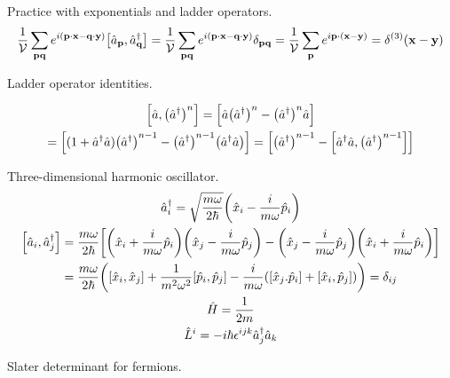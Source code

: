 \documentclass{report}
\begin{document}
\begin{subquests}
	\item Practice with exponentials and ladder operators.
	\begin{gather*}
		\frac{1}{\cal{V}}\sum_{\vb{pq}} e^{i\pqty{\vb p \cdot\vb x - \vb q \cdot \vb y}}\bqty{\hat{a}_{\vb p}, \hat{a}_{\vb q}^{\dagger}} = \frac{1}{\cal{V}}\sum_{\vb{pq}} e^{i\pqty{\vb p \cdot \vb x - \vb q \cdot \vb y}}\delta_{\vb{pq}} = \frac{1}{\cal{V}}\sum_{\vb p}e^{i \vb p \cdot\pqty{\vb x-\vb y}} = \delta^{(3)}(\vb x - \vb y)
	\end{gather*}

	\item Ladder operator identities.
	\begin{subquests}
		\item
		\begin{gather*}
			\bqty{\hat{a},\pqty{\hat{a}^{\dagger}}^n} = \bqty{\hat{a}\pqty{\hat{a}^{\dagger}}^n - \pqty{\hat{a}^{\dagger}}^n\hat{a}} \\
			= \bqty{(1+\hat{a}^{\dagger}\hat{a})\pqty{\hat{a}^{\dagger}}^{n-1} - \pqty{\hat{a}^{\dagger}}^{n-1}\pqty{\hat{a}^{\dagger}\hat{a}}} = \bqty{\pqty{\hat{a}^{\dagger}}^{n-1} - \bqty{\hat{a}^{\dagger}\hat{a},\pqty{\hat{a}^{\dagger}}^{n-1}}}		
		\end{gather*}

		\item

		\item

		\item
	\end{subquests}
	
	\item Three-dimensional harmonic oscillator.
	\begin{gather*}
		\hat{a}_i^{\dagger} = \sqrt{\frac{m\omega}{2\hbar}}\pqty{\hat{x}_i - \frac{i}{m\omega}\hat{p}_i} \\
		\bqty{\hat{a}_i,\hat{a}_j^{\dagger}} = \frac{m\omega}{2\hbar}\bqty{\pqty{\hat{x}_i + \frac{i}{m\omega}\hat{p}_i}\pqty{\hat{x}_j - \frac{i}{m\omega}\hat{p}_j} - \pqty{\hat{x}_j - \frac{i}{m\omega}\hat{p}_j}\pqty{\hat{x}_i + \frac{i}{m\omega}\hat{p}_i}} \\
		= \frac{m\omega}{2\hbar}\pqty{\bqty{\hat{x}_i,\hat{x}_j} + \frac{1}{m^2\omega^2}\bqty{\hat{p}_i,\hat{p}_j} - \frac{i}{m\omega}\pqty{\bqty{\hat{x}_j.\hat{p}_i} + \bqty{\hat{x}_i,\hat{p}_j}}} = \delta_{ij} \\
		\hat{H} = \frac{1}{2m}\\
		\hat{L}^i = -i\hbar\epsilon^{ijk}\hat{a}^{\dagger}_j\hat{a}_k		
	\end{gather*}

	\item Slater determinant for fermions.
\end{subquests}
\end{document}
